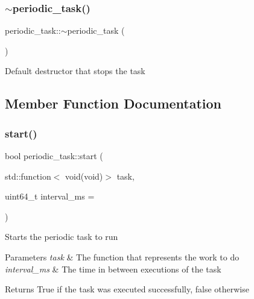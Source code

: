 \subsubsection{\texorpdfstring{$\sim$periodic\+\_\+task()}{~periodic\_task()}}
{\footnotesize\ttfamily periodic\+\_\+task\+::$\sim$periodic\+\_\+task (\begin{DoxyParamCaption}{ }\end{DoxyParamCaption})\hspace{0.3cm}{\ttfamily [inline]}}

Default destructor that stops the task 

\subsection{Member Function Documentation}
\mbox{\label{classperiodic__task_a17829d0796787612e33a912f7f1188af}} 
\subsubsection{\texorpdfstring{start()}{start()}}
{\footnotesize\ttfamily bool periodic\+\_\+task\+::start (\begin{DoxyParamCaption}\item[{std\+::function$<$ void(void)$>$}]{task,  }\item[{uint64\+\_\+t}]{interval\+\_\+ms = {} }\end{DoxyParamCaption})\hspace{0.3cm}{\ttfamily [inline]}}

Starts the periodic task to run 
\begin{DoxyParams}{Parameters}
{\em task} & The function that represents the work to do \\
\hline
{\em interval\+\_\+ms} & The time in between executions of the task \\
\hline
\end{DoxyParams}
\begin{DoxyReturn}{Returns}
True if the task was executed successfully, false otherwise 
\end{DoxyReturn}
\mbox{\label{classperiodic__task_a3e9de732bfaf096cb4f83a8813958f5a}} 
